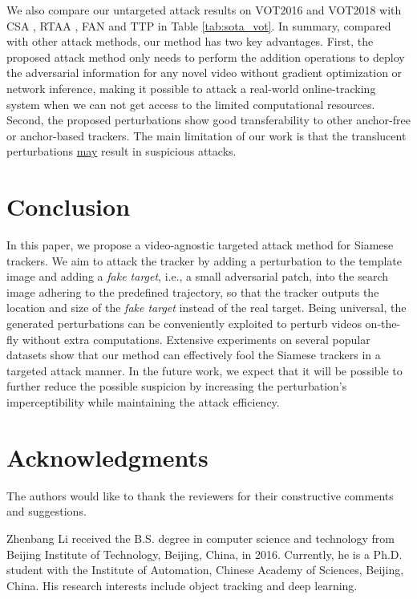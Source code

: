 \documentclass[journal]{IEEEtran}
\newcommand{\ie}{i.e.}
\begin{document}
We also compare our untargeted attack results on VOT2016 and VOT2018 with CSA \cite{CSA}, RTAA \cite{RTAA}, FAN \cite{FAN} and TTP \cite{TTP} in Table \ref{tab:sota_vot}. In summary, compared with other attack methods, our method has two key advantages. First, the proposed attack method only needs to perform the addition operations to deploy the adversarial information for any novel video without gradient optimization or network inference, making it possible to attack a real-world online-tracking system when we can not get access to the limited computational resources. Second, the proposed perturbations show good transferability to other anchor-free or anchor-based trackers. The main limitation of our work is that the translucent perturbations \uline{may} result in suspicious attacks.

\section{Conclusion}
In this paper, we propose a video-agnostic targeted attack method for Siamese trackers. We aim to attack the tracker by adding a perturbation to the template image and adding a \textit{fake target}, \ie, a small adversarial patch, into the search image adhering to the predefined trajectory, so that the tracker outputs the location and size of the \textit{fake target} instead of the real target. Being universal, the generated perturbations can be conveniently exploited to perturb videos on-the-fly without extra computations. Extensive experiments on several popular datasets show that our method can effectively fool the Siamese trackers in a targeted attack manner. In the future work, we expect that it will be possible to further reduce the possible suspicion by increasing the perturbation's imperceptibility while maintaining the attack efficiency.

\section*{Acknowledgments}
The authors would like to thank the reviewers for their constructive comments and suggestions.

\normalem



\begin{IEEEbiography}
{Zhenbang Li}
received the B.S. degree in computer science and technology from Beijing Institute of Technology, Beijing, China, in 2016. Currently, he is a Ph.D. student with the Institute of Automation, Chinese Academy of Sciences, Beijing, China. His research interests include object tracking and deep learning.
\end{IEEEbiography}
\end{document}
